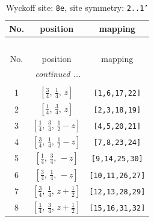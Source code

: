 \documentclass[fleqn,8pt]{jsarticle}
\begin{document}
\renewcommand{\arraystretch}{1.2}
\begin{longtable}{ccc}
\caption{Wyckoff site: {\tt 8e}, site symmetry: {\tt 2..1'}}
 \\
 \hline \hline
No. & position & mapping \\ \hline \endfirsthead

\multicolumn{2}{l}{\tablename\ \thetable{}} \\
 \hline \hline
No. & position & mapping \\ \hline \endhead

 \hline \hline
\multicolumn{2}{r}{\footnotesize\it continued ...} \\ \endfoot

 \hline \hline
\multicolumn{2}{r}{} \\ \endlastfoot

1 & $\left[ \frac{3}{4},\, \frac{1}{4},\, z \right]$ & {\tt [1,6,17,22]} \\ \hline
2 & $\left[ \frac{1}{4},\, \frac{3}{4},\, z \right]$ & {\tt [2,3,18,19]} \\ \hline
3 & $\left[ \frac{1}{4},\, \frac{3}{4},\, \frac{1}{2} - z \right]$ & {\tt [4,5,20,21]} \\ \hline
4 & $\left[ \frac{3}{4},\, \frac{1}{4},\, \frac{1}{2} - z \right]$ & {\tt [7,8,23,24]} \\ \hline
5 & $\left[ \frac{1}{4},\, \frac{3}{4},\, - z \right]$ & {\tt [9,14,25,30]} \\ \hline
6 & $\left[ \frac{3}{4},\, \frac{1}{4},\, - z \right]$ & {\tt [10,11,26,27]} \\ \hline
7 & $\left[ \frac{3}{4},\, \frac{1}{4},\, z + \frac{1}{2} \right]$ & {\tt [12,13,28,29]} \\ \hline
8 & $\left[ \frac{1}{4},\, \frac{3}{4},\, z + \frac{1}{2} \right]$ & {\tt [15,16,31,32]} \\
\end{longtable}
\renewcommand{\arraystretch}{1.2}
\end{document}
